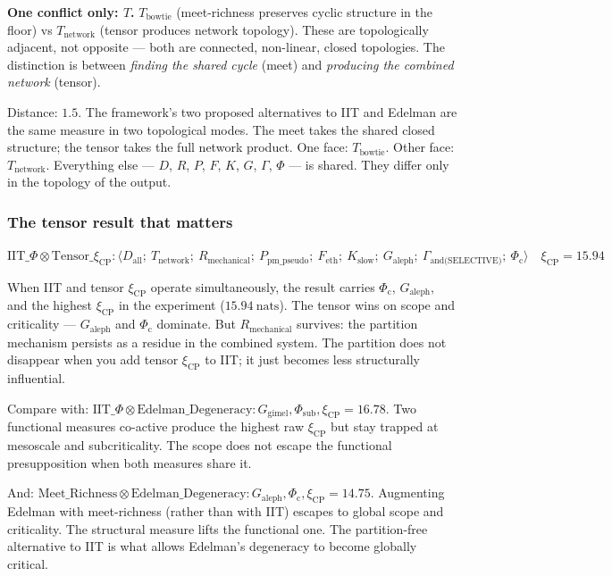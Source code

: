 \documentclass[12pt,a4paper]{article}
\begin{document}
\textbf{One conflict only: $T$.} $T_\text{bowtie}$ (meet-richness preserves cyclic structure in the floor) vs $T_\text{network}$ (tensor produces network topology). These are topologically adjacent, not opposite --- both are connected, non-linear, closed topologies. The distinction is between \emph{finding the shared cycle} (meet) and \emph{producing the combined network} (tensor).

Distance: $1.5$. The framework's two proposed alternatives to IIT and Edelman are the same measure in two topological modes. The meet takes the shared closed structure; the tensor takes the full network product. One face: $T_\text{bowtie}$. Other face: $T_\text{network}$. Everything else --- $D$, $R$, $P$, $F$, $K$, $G$, $\Gamma$, $\Phi$ --- is shared. They differ only in the topology of the output.

\subsubsection{The tensor result that matters}

$\mathrm{IIT}\_\Phi \otimes \mathrm{Tensor}\_\xi_{\mathrm{CP}}: \langle D_\text{all};\ T_\text{network};\ R_\text{mechanical};\ P_\text{pm\_pseudo};\ F_\text{eth};\ K_\text{slow};\ G_\text{aleph};\ \Gamma_\text{and(SELECTIVE)};\ \Phi_\text{c} \rangle \quad \xi_\text{CP} = 15.94$

When IIT and tensor $\xi_\text{CP}$ operate simultaneously, the result carries $\Phi_\text{c}$, $G_\text{aleph}$, and the highest $\xi_\text{CP}$ in the experiment ($15.94\ \text{nats}$). The tensor wins on scope and criticality --- $G_\text{aleph}$ and $\Phi_\text{c}$ dominate. But $R_\text{mechanical}$ survives: the partition mechanism persists as a residue in the combined system. The partition does not disappear when you add tensor $\xi_\text{CP}$ to IIT; it just becomes less structurally influential.

Compare with: $\mathrm{IIT}\_\Phi \otimes \text{Edelman\_Degeneracy}: G_\text{gimel}, \Phi_\text{sub}, \xi_\text{CP} = 16.78$. Two functional measures co-active produce the highest raw $\xi_\text{CP}$ but stay trapped at mesoscale and subcriticality. The scope does not escape the functional presupposition when both measures share it.

And: $\text{Meet\_Richness} \otimes \text{Edelman\_Degeneracy}: G_\text{aleph}, \Phi_\text{c}, \xi_\text{CP} = 14.75$. Augmenting Edelman with meet-richness (rather than with IIT) escapes to global scope and criticality. The structural measure lifts the functional one. The partition-free alternative to IIT is what allows Edelman's degeneracy to become globally critical.
\end{document}
